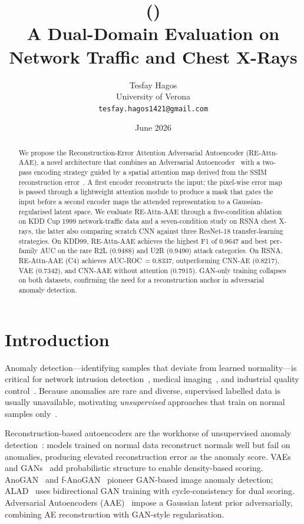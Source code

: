 \documentclass[11pt,a4paper]{article}
\title{%
  \textbf{\methodlong{} (\method)}\\[4pt]
  \large A Dual-Domain Evaluation on Network Traffic and Chest X-Rays
}
\author{Tesfay Hagos \\ \small University of Verona \\ \small \texttt{tesfay.hagos1421@gmail.com}}
\date{June 2026}
\newcommand{\method}{RE-Attn-AAE}
\newcommand{\methodlong}{Reconstruction-Error Attention Adversarial Autoencoder}
\begin{document}
\maketitle

\begin{abstract}
We propose the \methodlong{} (\method{}), a novel architecture that combines an
Adversarial Autoencoder~\cite{makhzani_aae_2015} with a two-pass encoding strategy guided
by a spatial attention map derived from the SSIM reconstruction
error~\cite{wang_ssim_2004}.
A first encoder reconstructs the input; the pixel-wise error map is passed through
a lightweight attention module to produce a mask that gates the input before a second
encoder maps the attended representation to a Gaussian-regularised latent space.
We evaluate \method{} through a five-condition ablation on KDD Cup 1999 network-traffic
data and a seven-condition study on RSNA chest X-rays, the latter also comparing
scratch CNN against three ResNet-18 transfer-learning strategies.
On KDD99, \method{} achieves the highest F1 of 0.9647 and best per-family AUC on the
rare R2L (0.9488) and U2R (0.9490) attack categories.
On RSNA, \method{} (C4) achieves AUC-ROC\,$=0.8337$, outperforming CNN-AE (0.8217),
VAE (0.7342), and CNN-AAE without attention (0.7915).
GAN-only training collapses on both datasets, confirming the need for a reconstruction
anchor in adversarial anomaly detection.
\end{abstract}

\tableofcontents
\clearpage

\section{Introduction}

Anomaly detection—identifying samples that deviate from learned normality—is critical
for network intrusion detection~\cite{improving_ae_nslkdd_2021,arae_network_2025},
medical imaging~\cite{baur_ae_survey_2021,schlegl_fanogan_2019},
and industrial quality control~\cite{pang_survey_2021}.
Because anomalies are rare and diverse, supervised labelled data is usually unavailable,
motivating \emph{unsupervised} approaches that train on normal samples
only~\cite{chalapathy_survey_2019}.

Reconstruction-based autoencoders are the workhorse of unsupervised anomaly
detection~\cite{baur_ae_survey_2021}: models trained on normal data reconstruct
normals well but fail on anomalies, producing elevated reconstruction error as the
anomaly score.
VAEs~\cite{kingma_vae_2013} and GANs~\cite{goodfellow_gan_2014} add probabilistic
structure to enable density-based scoring.
AnoGAN~\cite{schlegl_anogan_2017} and f-AnoGAN~\cite{schlegl_fanogan_2019} pioneer
GAN-based image anomaly detection; ALAD~\cite{zenati_alad_2018} uses bidirectional
GAN training with cycle-consistency for dual scoring.
Adversarial Autoencoders (AAE)~\cite{makhzani_aae_2015} impose a Gaussian latent
prior adversarially, combining AE reconstruction with GAN-style regularisation.
\end{document}
